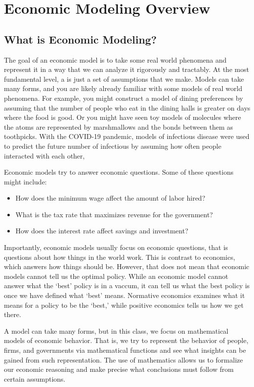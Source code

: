 \chapter{Economic Modeling Overview}

\section{What is Economic Modeling?}
The goal of an economic model is to take some real world phenomena and represent it in a way that we can analyze it rigorously and tractably. At the most fundamental level, a  is just a set of assumptions that we make. Models can take many forms, and you are likely already familiar with some models of real world phenomena. For example, you might construct a model of dining preferences by assuming that the number of people who eat in the dining halls is greater on days where the food is good. Or you might have seen toy models of molecules where the atoms are represented by marshmallows and the bonds between them as toothpicks. With the COVID-19 pandemic, models of infectious disease were used to predict the future number of infectious by assuming how often people interacted with each other,  

Economic models try to answer economic questions. Some of these questions might include:
\begin{itemize}
    \item How does the minimum wage affect the amount of labor hired?
    \item What is the tax rate that maximizes revenue for the government?
    \item How does the interest rate affect savings and investment?
\end{itemize}
Importantly, economic models usually focus on  economic questions, that is questions about how things in the world work. This is contrast to  economics, which answers how things should be. However, that does not mean that economic models cannot tell us the optimal policy. While an economic model cannot answer what the `best' policy is in a vaccum, it can tell us what the best policy is once we have defined what `best' means. Normative economics examines what it means for a policy to be the `best,' while positive economics tells us how we get there.

A model can take many forms, but in this class, we focus on mathematical models of economic behavior. That is, we try to represent the behavior of people, firms, and governments via mathematical functions and see what insights can be gained from such representation. The use of mathematics allows us to formalize our economic reasoning and make precise what conclusions must follow from certain assumptions. 

